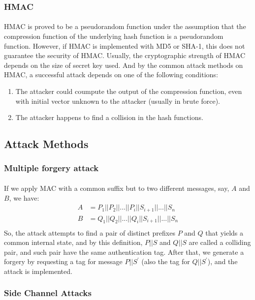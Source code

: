 \subsubsection{HMAC}
\paragraph{}HMAC is proved to be a pseudorandom function under the assumption that the compression function of the underlying hash function is a pseudorandom function. However, if HMAC is implemented with MD5 or SHA-1, this does not guarantee the security of HMAC. Usually, the cryptographic strength of HMAC depends on the size of secret key used. And by the common attack methods on HMAC, a successful attack depends on one of the following conditions:
\begin{enumerate}
    \item The attacker could coumpute the output of the compression function, even with initial vector unknown to the attacker (usually in brute force).
    \item The attacker happens to find a collision in the hash functions.
\end{enumerate}
\subsection{Attack Methods}
\subsubsection{Multiple forgery attack}
\paragraph{} If we apply MAC with a common suffix but to two different messages, say, $A$ and $B$, we have:
\begin{align*}
    A &= P_1 || P_2 || ...||P_i||S_{i+1}||...||S_n\\
    B &= Q_1 || Q_2 || ...||Q_i||S_{i+1}||...||S_n\\
\end{align*}
So, the attack attempts to find a pair of distinct prefixes $P$ and $Q$ that yields a common internal state, and by this definition, $P||S$ and $Q||S$ are called a colliding pair, and such pair have the same authentication tag. After that, we generate a forgery by requesting a tag for message $P||S^{'}$ (also the tag for $Q||S^{'}$), and the attack is implemented.
\subsubsection{Side Channel Attacks}
